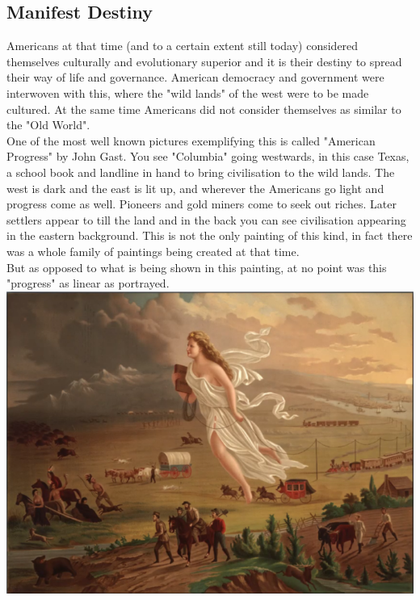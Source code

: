 \documentclass{article}
\begin{document}
	\subsection{Manifest Destiny}
	Americans at that time (and to a certain extent still today) considered themselves culturally and evolutionary superior and it is their destiny to spread their way of life and governance. American democracy and government were interwoven with this, where the "wild lands" of the west were to be made cultured. At the same time Americans did not consider themselves as similar to the "Old World". \\
	One of the most well known pictures exemplifying this is called "American Progress" by John Gast. You see "Columbia" going westwards, in this case Texas, a school book and landline in hand to bring civilisation to the wild lands. The west is dark and the east is lit up, and wherever the Americans go light and progress come as well. Pioneers and gold miners come to seek out riches. Later settlers appear to till the land and in the back you can see civilisation appearing in the eastern background. This is not the only painting of this kind, in fact there was a whole family of paintings being created at that time. \\
	But as opposed to what is being shown in this painting, at no point was this "progress" as linear as portrayed. \\
	\includegraphics{American_Progress.png} \\
\end{document}
